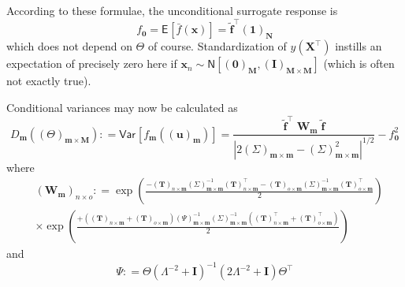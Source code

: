 \documentclass[preprint,12pt]{elsarticle}
\newcommand*{\M}[1]{\ensuremath{#1}\xspace}
\newcommand*{\vr}[1]{\M{\mathbf{#1}}}
\newcommand*{\deq}{\M{\mathrel{\mathop:}=}}
\newcommand*{\ev}[2][]{\mathsf{E}_{#1}\!\left\lbrack{} #2 \right\rbrack}
\newcommand*{\var}[2][]{\mathsf{Var}_{#1}\!\left\lbrack{} #2 \right\rbrack}
\newcommand*{\gauss}[2]{\mathsf{N}\!\left\lbrack{} #1 , #2 \right\rbrack}
\newcommand*{\modulus}[1]{\M{\left\lvert#1\right\rvert}}
\begin{document}
            According to these formulae, the unconditional surrogate response is
            \begin{equation} \label{eq:Method:GSA:f_0}
                f_{\vr{0}} = \ev{\bar{f}(\vr{x})} = \tilde{\vr{f}}^{\intercal} (\vr{1})_{\vr{N}}
            \end{equation}
            which does not depend on $\Theta$ of course. Standardization of $y(\vr{X}^{\intercal})$ instills an expectation of precisely zero here if $\vr{x}_{n} \sim \gauss{(\vr{0})_{\vr{M}}}{(\vr{I})_{\vr{M}\times\vr{M}}}$ (which is often not exactly true).

            Conditional variances may now be calculated as
            \begin{equation} \label{eq:Method:GSA:DmDef}
                D_{\vr{m}}((\Theta)_{\vr{m}\times\vr{M}}) \deq \var{f_{\vr{m}}((\vr{u})_{\vr{m}})}
                = \frac {\tilde{\vr{f}}^{\intercal} \; \vr{W}_{\vr{m}} \; \tilde{\vr{f}}}
                    {\modulus{2(\Sigma)_{\vr{m}\times\vr{m}} - (\Sigma)_{\vr{m}\times\vr{m}}^{2}}^{1/2}}
                - f_{\vr{0}}^{2}
            \end{equation}
            where
            \begin{equation} \label{eq:Method:GSA:WmDef}
                \begin{aligned}
                    &(\vr{W}_{\vr{m}})_{n \times o} \deq
                    \exp\!\left(\frac{
                        -(\vr{T})_{n\times\vr{m}}(\Sigma)_{\vr{m}\times\vr{m}}^{-1}
                        (\vr{T})_{n\times\vr{m}}^{\intercal} 
                        -(\vr{T})_{o\times\vr{m}}(\Sigma)_{\vr{m}\times\vr{m}}^{-1}
                        (\vr{T})_{o\times\vr{m}}^{\intercal}
                        }{2}\right) \\
                        &\times\exp\!\left(\frac{
                            + \left((\vr{T})_{n\times\vr{m}}+(\vr{T})_{o\times\vr{m}}\right)
                            (\Psi)_{\vr{m}\times\vr{m}}^{-1}(\Sigma)_{\vr{m}\times\vr{m}}^{-1}
                            \left((\vr{T})_{n\times\vr{m}}^{\intercal}+(\vr{T})_{o\times\vr{m}}^{\intercal}\right)
                            }{2}\right)
                \end{aligned}
            \end{equation}
            and
            \begin{equation} \label{eq:Method:GSA:PhiDef}
                \Psi \deq \Theta \left(\Lambda^{-2}+\vr{I}\right)^{-1}\left(2\Lambda^{-2}+\vr{I}\right) 
                \Theta^{\intercal}
            \end{equation}
\end{document}
